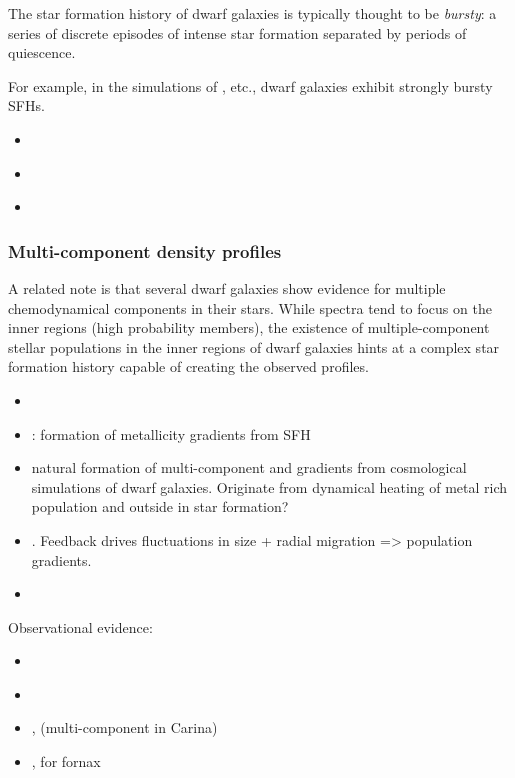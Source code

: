 The star formation history of dwarf galaxies is typically thought to be
\emph{bursty}: a series of discrete episodes of intense star formation
separated by periods of quiescence.

For example, in the simulations of \citet{wheeler+2019}, etc., dwarf
galaxies exhibit strongly bursty SFHs.

\begin{itemize}
\tightlist
\item
  \citet{maxwell+2012}
\item
  \citet{wright+2019}
\item
  \citet{azartash-namin+2024}
\end{itemize}

\subsubsection{Multi-component density
profiles}\label{multi-component-density-profiles}

A related note is that several dwarf galaxies show evidence for multiple
chemodynamical components in their stars. While spectra tend to focus on
the inner regions (high probability members), the existence of
multiple-component stellar populations in the inner regions of dwarf
galaxies hints at a complex star formation history capable of creating
the observed profiles.

\begin{itemize}
\tightlist
\item
  \citet{benitez-llambay+2016}
\item
  \citet{mercado+2021}: formation of metallicity gradients from SFH
\item
  \citet{revaz+jablonka2018} natural formation of multi-component and
  gradients from cosmological simulations of dwarf galaxies. Originate
  from dynamical heating of metal rich population and outside in star
  formation?
\item
  \citet{el-badry+2016}. Feedback drives fluctuations in size + radial
  migration =\textgreater{} population gradients.
\item
\end{itemize}

Observational evidence:

\begin{itemize}
\tightlist
\item
  \citet{arroyo-polonio+2024}
\item
  \citet{pace+2020}
\item
  \citet{fabrizio+2016}, \citet{kordopatis+2016} (multi-component in
  Carina)
\item
  \citet{battaglia+2006}, \citet{amorisco+evans2012} for fornax
\end{itemize}


